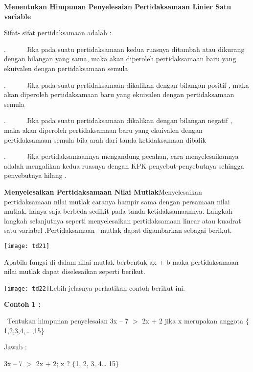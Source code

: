 \documentclass[11pt,fleqn]{book} %
\begin{document}
\noindent \textbf{Menentukan Himpunan Penyelesaian Pertidaksamaan Linier Satu variable}

\noindent Sifat- sifat pertidaksamaan adalah :

.~~~~~~Jika pada suatu pertidaksamaan kedua ruasnya ditambah atau dikurang dengan bilangan yang sama, maka akan diperoleh pertidaksamaan baru yang ekuivalen dengan pertidaksamaan semula

.~~~~~~Jika pada suatu pertidaksamaan dikalikan dengan bilangan positif , maka akan diperoleh pertidaksamaan baru yang ekuivalen dengan pertidaksamaan semula

.~~~~~~Jika pada suatu pertidaksamaan dikalikan dengan bilangan negatif , maka akan diperoleh pertidaksamaan baru yang ekuivalen dengan pertidaksamaan semula bila arah dari tanda ketidaksamaan dibalik ~

.~~~~~~Jika pertidaksamaannya mengandung pecahan, cara menyelesaikannya adalah mengalikan kedua ruasnya dengan KPK penyebut-penyebutnya sehingga penyebutnya hilang .

\noindent \textbf{}

\noindent \textbf{Menyelesaikan Pertidaksamaan Nilai Mutlak}Menyelesaikan pertidaksamaan nilai mutlak caranya hampir sama dengan persamaan nilai mutlak. hanya saja berbeda sedikit pada tanda ketidaksamaannya. Langkah-langkah selanjutnya seperti menyelesaikan pertidaksamaan linear atau kuadrat satu variabel .Pertidaksamaan~ mutlak dapat digambarkan sebagai berikut.

\noindent \texttt{[image: td21]}

\noindent Apabila fungsi di dalam nilai mutlak berbentuk ax + b maka pertidaksamaan nilai mutlak dapat diselesaikan seperti berikut.

\noindent \texttt{[image: td22]}Lebih jelasnya perhatikan contoh berikut ini.

\noindent \textbf{Contoh 1 :}

\noindent ~Tentukan himpunan penyelesaian 3x -- 7 $>$ 2x + 2 jika x merupakan anggota $\{$1,2,3,4,{\dots} ,15$\}$

\noindent 

\noindent 

\noindent 

\noindent Jawab :

\noindent 3x -- 7 $>$ 2x + 2; x ? $\{$1, 2, 3, 4{\dots} 15$\}$
\end{document}
